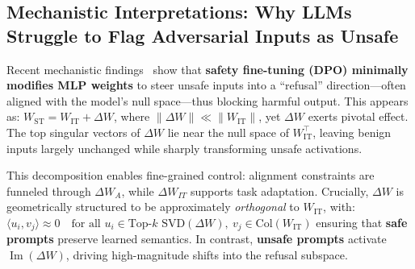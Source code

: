 






\subsection{Mechanistic Interpretations: Why LLMs Struggle to Flag Adversarial Inputs as Unsafe}

Recent mechanistic findings~\citep{NEURIPS2024_a9bef53e} show that \textbf{safety fine-tuning (DPO) minimally modifies MLP weights} to steer unsafe inputs into a “refusal” direction—often aligned with the model’s null space—thus blocking harmful output. This appears as:
$W_{\mathrm{ST}} = W_{\mathrm{IT}} + \Delta W$, where \(\|\Delta W\| \ll \|W_{\mathrm{IT}}\|\), yet \(\Delta W\) exerts pivotal effect. The top singular vectors of \(\Delta W\) lie near the null space of \(W_{\mathrm{IT}}^\top\), leaving benign inputs largely unchanged while sharply transforming unsafe activations.








This decomposition enables fine-grained control: alignment constraints are funneled through $\Delta W_A$, while $\Delta W_{IT}$ supports task adaptation. Crucially, $\Delta W$ is geometrically structured to be approximately \emph{orthogonal} to $W_{\mathrm{IT}}$, with:
$\langle u_i, v_j \rangle \approx 0 \quad \text{for all } u_i \in \text{Top-}k\text{ SVD}(\Delta W),\ v_j \in \text{Col}(W_{\mathrm{IT}})$ ensuring that \textbf{safe prompts} preserve learned semantics. In contrast, \textbf{unsafe prompts} activate $\operatorname{Im}(\Delta W)$, driving high-magnitude shifts into the refusal subspace.





